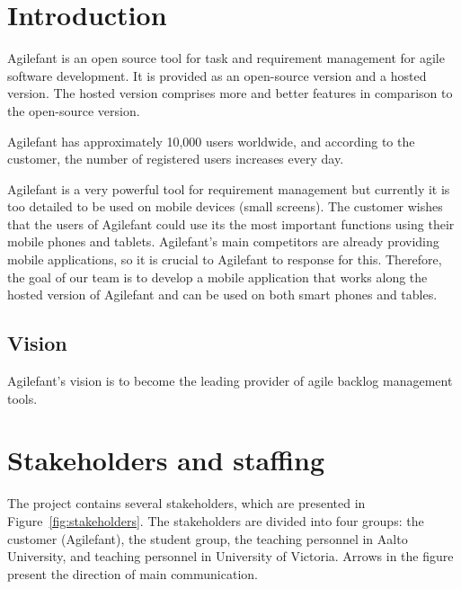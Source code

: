 \section{Introduction}
Agilefant is an open source tool for task and requirement management for agile 
software development. It is provided as an open-source version and a hosted 
version. The hosted version comprises more and better features in comparison to 
the open-source version.

Agilefant has approximately 10,000 users worldwide, and according to the 
customer, the number of registered users increases every day. 
 
Agilefant is a very powerful tool for requirement management but currently it 
is too detailed to be used on mobile devices (small screens). The customer 
wishes that the users of Agilefant could use its the most important functions 
using their mobile phones and tablets. Agilefant's main competitors are already 
providing mobile applications, so it is crucial to Agilefant to response for 
this. Therefore, the goal of our team is to develop a mobile application that 
works along the hosted version of Agilefant and can be used on both smart 
phones and tables.

\subsection{Vision}

Agilefant's vision is to become the leading provider of agile backlog management
tools.

\section{Stakeholders and staffing}

The project contains several stakeholders, which are presented in
Figure~\ref{fig:stakeholders}. The stakeholders are divided into four groups:
the customer (Agilefant), the student group, the teaching personnel in Aalto
University, and teaching personnel in University of Victoria. Arrows in the
figure present the direction of main communication.

